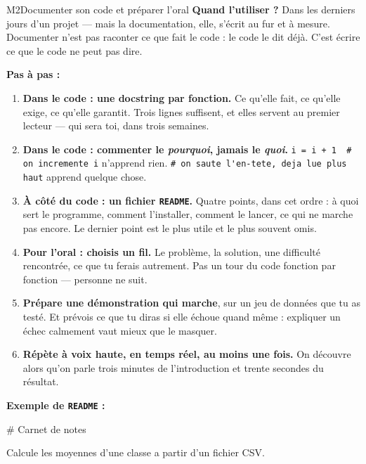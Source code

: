 \begin{fichemethode}{M2}{Documenter son code et préparer l'oral}
\textbf{Quand l'utiliser ?} Dans les derniers jours d'un projet — mais la documentation, elle,
s'écrit au fur et à mesure. Documenter n'est pas raconter ce que fait le code : le code le
dit déjà. C'est écrire ce que le code ne peut pas dire.

\textbf{Pas à pas :}
\begin{enumerate}
  \item \textbf{Dans le code : une docstring par fonction.} Ce qu'elle fait, ce qu'elle
    exige, ce qu'elle garantit. Trois lignes suffisent, et elles servent au premier lecteur
    — qui sera toi, dans trois semaines.
  \item \textbf{Dans le code : commenter le \emph{pourquoi}, jamais le \emph{quoi}.}
    \lstinline{i = i + 1  # on incremente i} n'apprend rien.
    \lstinline{# on saute l'en-tete, deja lue plus haut} apprend quelque chose.
  \item \textbf{À côté du code : un fichier \lstinline{README}.} Quatre points, dans cet
    ordre : à quoi sert le programme, comment l'installer, comment le lancer, ce qui ne
    marche pas encore. Le dernier point est le plus utile et le plus souvent omis.
  \item \textbf{Pour l'oral : choisis un fil.} Le problème, la solution, une difficulté
    rencontrée, ce que tu ferais autrement. Pas un tour du code fonction par fonction —
    personne ne suit.
  \item \textbf{Prépare une démonstration qui marche}, sur un jeu de données que tu as
    testé. Et prévois ce que tu diras si elle échoue quand même : expliquer un échec
    calmement vaut mieux que le masquer.
  \item \textbf{Répète à voix haute, en temps réel, au moins une fois.} On découvre alors
    qu'on parle trois minutes de l'introduction et trente secondes du résultat.
\end{enumerate}

\textbf{Exemple de \lstinline{README} :}

\begin{console}
# Carnet de notes

Calcule les moyennes d'une classe a partir d'un fichier CSV.


\end{console}
\end{fichemethode}
